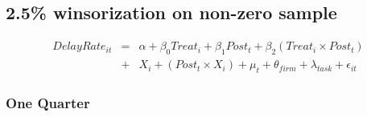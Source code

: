 \documentclass[
]{article}
\begin{document}
\hypertarget{winsorization-on-non-zero-sample}{%
\subsection{2.5\% winsorization on non-zero
sample}\label{winsorization-on-non-zero-sample}}

\[ \begin{aligned} DelayRate_{it} &=& \alpha+\beta_0 Treat_i + \beta_1 Post_t + \beta_2 (Treat_i \times Post_t)\\
&+&  X_i + (Post_t \times X_i) + \mu_t + \theta_{firm} + \lambda_{task}+ \epsilon_{it}
\end{aligned}\]

\hypertarget{one-quarter-5}{%
\subsubsection{One Quarter}\label{one-quarter-5}}
\end{document}
